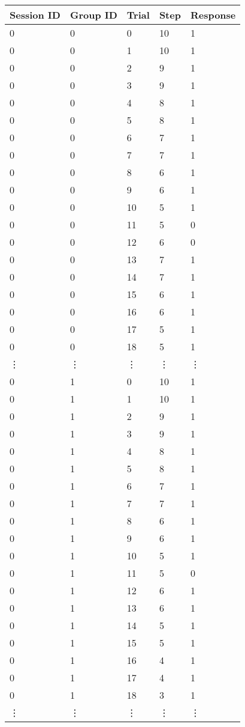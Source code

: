 \begin{center}
	\begin{tabularx}{\textwidth}{|X|X|X|X|X|}
		\hline
		\textbf{Session ID} & \textbf{Group ID} & \textbf{Trial} & \textbf{Step} & \textbf{Response} \\
		\hline
		0 & 0 & 0 & 10 & 1 \\
		0 & 0 & 1 & 10 & 1 \\
		0 & 0 & 2 & 9 & 1 \\
		0 & 0 & 3 & 9 & 1 \\
		0 & 0 & 4 & 8 & 1 \\
		0 & 0 & 5 & 8 & 1 \\
		0 & 0 & 6 & 7 & 1 \\
		0 & 0 & 7 & 7 & 1 \\
		0 & 0 & 8 & 6 & 1 \\
		0 & 0 & 9 & 6 & 1 \\
		0 & 0 & 10 & 5 & 1 \\
		0 & 0 & 11 & 5 & 0 \\
		0 & 0 & 12 & 6 & 0 \\
		0 & 0 & 13 & 7 & 1 \\
		0 & 0 & 14 & 7 & 1 \\
		0 & 0 & 15 & 6 & 1 \\
		0 & 0 & 16 & 6 & 1 \\
		0 & 0 & 17 & 5 & 1 \\
		0 & 0 & 18 & 5 & 1 \\
		\vdots & \vdots & \vdots & \vdots & \vdots\\
		\hline
		0 & 1 & 0 & 10 & 1 \\
		0 & 1 & 1 & 10 & 1 \\
		0 & 1 & 2 & 9 & 1 \\
		0 & 1 & 3 & 9 & 1 \\
		0 & 1 & 4 & 8 & 1 \\
		0 & 1 & 5 & 8 & 1 \\
		0 & 1 & 6 & 7 & 1 \\
		0 & 1 & 7 & 7 & 1 \\
		0 & 1 & 8 & 6 & 1 \\
		0 & 1 & 9 & 6 & 1 \\
		0 & 1 & 10 & 5 & 1 \\
		0 & 1 & 11 & 5 & 0 \\
		0 & 1 & 12 & 6 & 1 \\
		0 & 1 & 13 & 6 & 1 \\
		0 & 1 & 14 & 5 & 1 \\
		0 & 1 & 15 & 5 & 1 \\
		0 & 1 & 16 & 4 & 1 \\
		0 & 1 & 17 & 4 & 1 \\
		0 & 1 & 18 & 3 & 1 \\
		\vdots & \vdots & \vdots & \vdots & \vdots\\
		\hline
	\end{tabularx}
\end{center}
